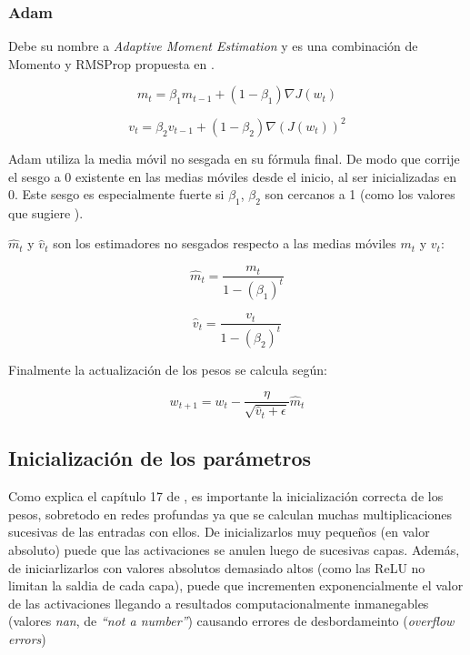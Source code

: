 \subsubsection{Adam} \label{subsubection:adams}

Debe su nombre a \textit{Adaptive Moment Estimation} y es una combinación de Momento y RMSProp propuesta en \cite{adam}. 

\begin{equation*}
    m_t = \beta_1 m_{t-1} + (1-\beta_1) \nabla J(w_t)
\end{equation*}

\begin{equation*}
    v_t = \beta_2 v_{t-1} + (1-\beta_2) \nabla (J(w_t))^2
\end{equation*}

Adam utiliza la media móvil no sesgada en su fórmula final. De modo que corrije el sesgo a $0$ existente en las medias móviles desde el inicio, al ser inicializadas en 0. Este sesgo es especialmente fuerte si $\beta_1$, $\beta_2$ son cercanos a 1 (como los valores que sugiere \cite{adam}). 

$\hat{m}_t$ y $\hat{v}_t$ son los estimadores no sesgados respecto a las medias móviles $m_t$ y $v_t$:

\begin{equation*}
    \hat{m}_t = \frac{m_t}{1-(\beta_1)^{t}}
\end{equation*}


\begin{equation*}
    \hat{v}_t = \frac{v_t}{1-(\beta_2)^{t}}
\end{equation*}

Finalmente la actualización de los pesos se calcula según:

\begin{equation*}
    w_{t+1} = w_t - \frac{\eta}{\sqrt{\hat{v}_t+\epsilon}} \hat{m}_t
\end{equation*}


\subsection{Inicialización de los parámetros}

Como explica el capítulo 17 de \cite{fastbook}, es importante la inicialización correcta de los pesos, sobretodo en redes profundas ya que se calculan muchas multiplicaciones sucesivas de las entradas con ellos. De inicializarlos muy pequeños (en valor absoluto) puede que las activaciones se anulen luego de sucesivas capas. Además, de iniciarlizarlos con valores absolutos demasiado altos (como las ReLU no limitan la saldia de cada capa), puede que incrementen exponencialmente el valor de las activaciones llegando a resultados computacionalmente inmanegables (valores \textit{nan}, de \textit{``not a number''}) causando errores de desbordameinto (\textit{overflow errors})

